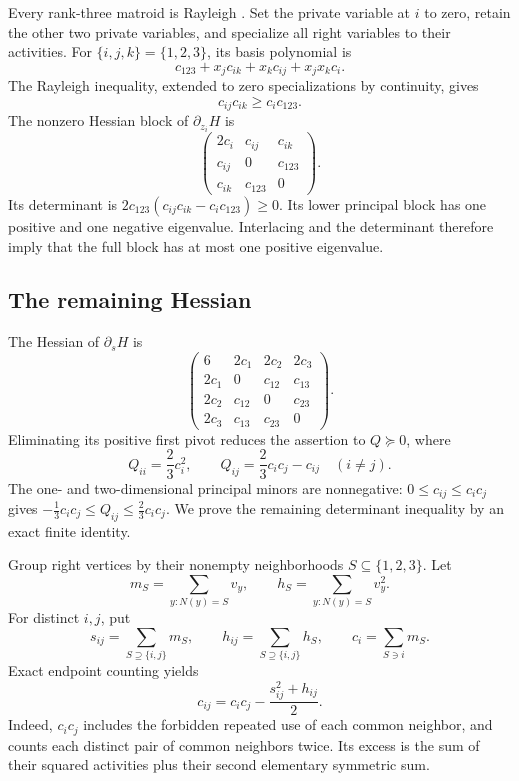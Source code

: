 \documentclass[11pt,a4paper]{article}
\theoremstyle{remark}\newtheorem{remark}[theorem]{Remark}
\begin{document}
Every rank-three matroid is Rayleigh \cite[Theorem 1.1]{b:Wagner}. Set the private
variable at $i$ to zero, retain the other two private variables, and specialize
all right variables to their activities. For $\{i,j,k\}=\{1,2,3\}$, its basis
polynomial is
\[
 c_{123}+x_j c_{ik}+x_k c_{ij}+x_jx_k c_i.
\]
The Rayleigh inequality, extended to zero specializations by continuity, gives
\begin{equation}\label{mrn:s:tv:eq:rayleigh}
 c_{ij}c_{ik}\ge c_i c_{123}.
\end{equation}
The nonzero Hessian block of $\partial_{z_i}H$ is
\[
 \begin{pmatrix}
 2c_i&c_{ij}&c_{ik}\\ c_{ij}&0&c_{123}\\c_{ik}&c_{123}&0
 \end{pmatrix}.
\]
Its determinant is $2c_{123}(c_{ij}c_{ik}-c_i c_{123})\ge0$.
Its lower principal block has one positive and one negative eigenvalue.
Interlacing and the determinant therefore imply that the full block has at
most one positive eigenvalue.

\subsection{The remaining Hessian}
The Hessian of $\partial_sH$ is
\[
 \begin{pmatrix}
 6&2c_1&2c_2&2c_3\\
 2c_1&0&c_{12}&c_{13}\\
 2c_2&c_{12}&0&c_{23}\\
 2c_3&c_{13}&c_{23}&0
 \end{pmatrix}.
\]
Eliminating its positive first pivot reduces the assertion to $Q\succeq0$,
where
\begin{equation}\label{mrn:s:tv:eq:Q}
 Q_{ii}=\frac23c_i^2,\qquad
 Q_{ij}=\frac23c_ic_j-c_{ij}\quad(i\ne j).
\end{equation}
The one- and two-dimensional principal minors are nonnegative:
$0\le c_{ij}\le c_ic_j$ gives
$-\frac13c_ic_j\le Q_{ij}\le\frac23c_ic_j$.
We prove the remaining determinant inequality by an exact finite identity.

Group right vertices by their nonempty neighborhoods
$S\subseteq\{1,2,3\}$. Let
\[
 m_S=\sum_{y:N(y)=S}v_y,\qquad
 h_S=\sum_{y:N(y)=S}v_y^2.
\]
For distinct $i,j$, put
\[
 s_{ij}=\sum_{S\supseteq\{i,j\}}m_S,\qquad
 h_{ij}=\sum_{S\supseteq\{i,j\}}h_S,\qquad
 c_i=\sum_{S\ni i}m_S.
\]
Exact endpoint counting yields
\begin{equation}\label{mrn:s:tv:eq:overlap}
 c_{ij}=c_ic_j-\frac{s_{ij}^2+h_{ij}}2.
\end{equation}
Indeed, $c_ic_j$ includes the forbidden repeated use of each common neighbor,
and counts each distinct pair of common neighbors twice. Its excess is the
sum of their squared activities plus their second elementary symmetric sum.
\end{document}
